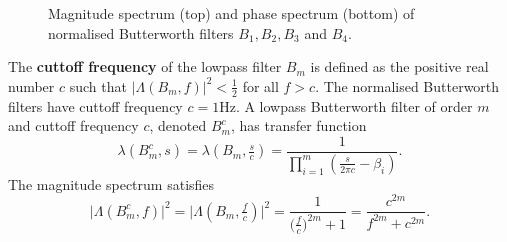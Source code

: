 \documentclass[11pt,a4paper]{book}
\theoremstyle{plain}
\numberwithin{equation}{section}
\newcommand{\term}{\textbf}
\newcommand{\abs}[1]{\left\vert #1 \right\vert}
\newcommand{\sabs}[1]{\vert #1 \vert}
\newcommand{\vtick}[1]{\draw (#1,-0.075) -- (#1,0.075) }
\newcommand{\htick}[1]{\draw (-0.075,#1) -- (0.075,#1)}
\begin{document}
{\begin{figure}[p]
    \vspace{1cm}
    \caption{Magnitude spectrum (top) and phase spectrum (bottom) of normalised Butterworth filters $B_1,B_2,B_3$ and $B_4$.} 
    \label{fig:butterworthspectrum}
  \end{figure}
}

The \term{cuttoff frequency} of the lowpass filter $B_m$ is defined as the positive real number $c$ such that $\abs{\Lambda(B_m,f)}^2 < \tfrac{1}{2}$ for all $f > c$.  The normalised Butterworth filters have cuttoff frequency $c = 1\si{\hertz}$.  A lowpass Butterworth filter of order $m$ and cuttoff frequency $c$, denoted $B_m^c$, has transfer function
\[
\lambda(B_m^c,s) = \lambda(B_m, \tfrac{s}{c}) = \frac{1}{\prod_{i=1}^m(\tfrac{s}{2\pi c} - \beta_i)}.
\] 
The magnitude spectrum satisfies
\begin{equation}\label{eq:butterworthspectrum}
\sabs{\Lambda(B_m^c,f)}^2 =  \sabs{\Lambda(B_m,\tfrac{f}{c})}^2 = \frac{1}{\big(\tfrac{f}{c}\big)^{2m} + 1} =  \frac{c^{2m}}{f^{2m} + c^{2m}}.
\end{equation}
\end{document}
